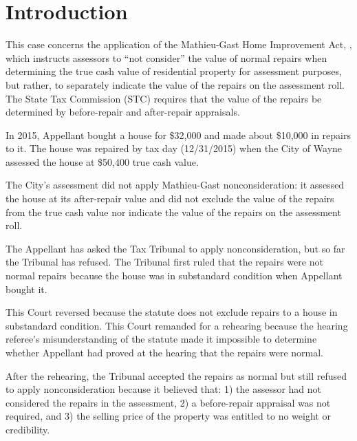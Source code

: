 \documentclass[12pt,\documentclassflag]{michiganCourtOfAppealsBrief}
\begin{document}
\newpage 
\section{Introduction}

This case concerns the application of the Mathieu-Gast Home Improvement Act, \cite[s]{MCL 211.27(2)}, which instructs assessors to ``not consider'' the value of normal repairs when determining the true cash value of residential property for assessment purposes, but rather, to separately indicate the value of the repairs on the assessment roll.
The State Tax Commission (STC) requires that the value of the repairs be determined by before-repair and after-repair appraisals.

In 2015, Appellant bought a house for \$32,000 and made about \$10,000 in repairs to it. The house was repaired by tax day (12/31/2015) when the City of Wayne assessed the house at \$50,400 true cash value.

The City's assessment did not apply Mathieu-Gast nonconsideration: it assessed the house at its after-repair value and did not exclude the value of the repairs from the true cash value nor indicate the value of the repairs on the assessment roll.

The Appellant has asked the Tax Tribunal to apply nonconsideration, but so far the Tribunal has refused. The Tribunal first ruled that the repairs were not normal repairs because the house was in substandard condition when Appellant bought it.

This Court reversed because the statute does not exclude repairs to a house in substandard condition.
This Court remanded for a rehearing because the hearing referee's misunderstanding of the statute made it impossible to determine whether Appellant had proved at the hearing that the repairs were normal.

After the rehearing, the Tribunal accepted the repairs as normal but still refused to apply nonconsideration because it believed that:
1) the assessor had not considered the repairs in the assessment,
2) a before-repair appraisal was not required, and
3) the selling price of the property was entitled to no weight or credibility.


\end{document}
